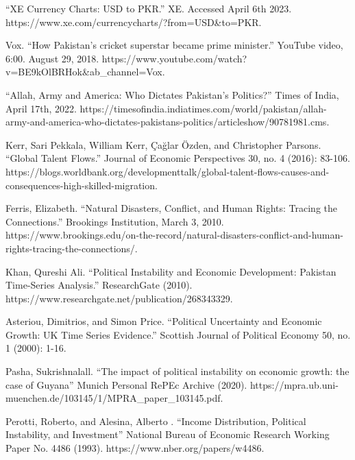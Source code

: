 \documentclass[11pt]{article}
\begin{document}
“XE Currency Charts: USD to PKR.” XE. Accessed April 6th 2023. \newline https://www.xe.com/currencycharts/?from=USD\&to=PKR. \newline

Vox. “How Pakistan's cricket superstar became prime minister.” YouTube video, 6:00. August 29, 2018. https://www.youtube.com/watch?v=BE9kOlBRHok\&ab\_channel=Vox. \newline

“Allah, Army and America: Who Dictates Pakistan’s Politics?” Times of India, April 17th, 2022. https://timesofindia.indiatimes.com/world/pakistan/allah-army-and-america-who-dictates-pakistans-politics/articleshow/90781981.cms. \newline

Kerr, Sari Pekkala, William Kerr, Çağlar Özden, and Christopher Parsons. “Global Talent Flows.” Journal of Economic Perspectives 30, no. 4 (2016): 83-106. https://blogs.worldbank.org/developmenttalk/global-talent-flows-causes-and-consequences-high-skilled-migration. \newline

Ferris, Elizabeth. “Natural Disasters, Conflict, and Human Rights: Tracing the Connections.” Brookings Institution, March 3, 2010. https://www.brookings.edu/on-the-record/natural-disasters-conflict-and-human-rights-tracing-the-connections/. \newline

Khan, Qureshi Ali. “Political Instability and Economic Development: Pakistan Time-Series Analysis.” ResearchGate (2010). https://www.researchgate.net/publication/268343329. \newline

Asteriou, Dimitrios, and Simon Price. “Political Uncertainty and Economic Growth: UK Time Series Evidence.” Scottish Journal of Political Economy 50, no. 1 (2000): 1-16. \newline

Pasha, Sukrishnalall. “The impact of political instability on economic growth: the case of Guyana” Munich Personal RePEc Archive (2020). \newline
https://mpra.ub.uni-muenchen.de/103145/1/MPRA\_paper\_103145.pdf. \newline

Perotti, Roberto, and Alesina, Alberto . “Income Distribution, Political Instability, and Investment” National Bureau of Economic Research Working Paper No. 4486 (1993). \newline https://www.nber.org/papers/w4486. \newline
\end{document}
